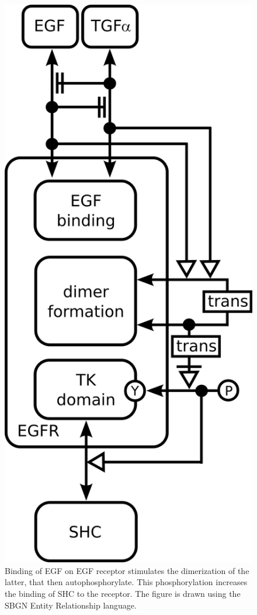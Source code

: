 \begin{figure}[H]
\begin{center}
\includegraphics{figs/pngs/example_EGFR.png}
\caption{Binding of EGF on EGF receptor stimulates the dimerization of the latter, that then autophosphorylate. This phosphorylation increases the binding of SHC to the receptor. The figure is drawn using the SBGN Entity Relationship language.}
\label{fig:EGFR}
\end{center}
\end{figure}

